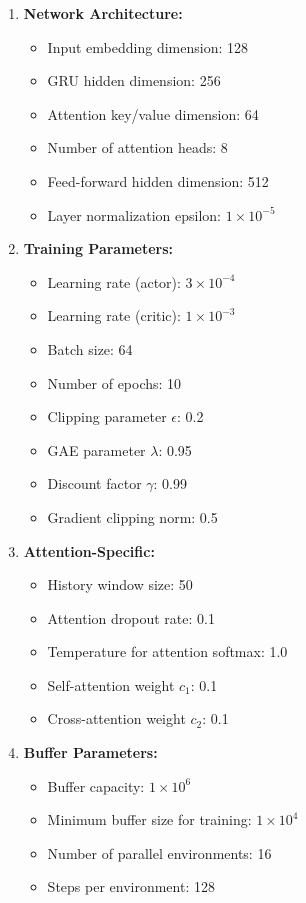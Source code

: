 \begin{enumerate}
\item \textbf{Network Architecture:}
   \begin{itemize}
   \item Input embedding dimension: 128
   \item GRU hidden dimension: 256
   \item Attention key/value dimension: 64
   \item Number of attention heads: 8
   \item Feed-forward hidden dimension: 512
   \item Layer normalization epsilon: $1 \times 10^{-5}$
   \end{itemize}

\item \textbf{Training Parameters:}
   \begin{itemize}
   \item Learning rate (actor): $3 \times 10^{-4}$
   \item Learning rate (critic): $1 \times 10^{-3}$
   \item Batch size: 64
   \item Number of epochs: 10
   \item Clipping parameter $\epsilon$: 0.2
   \item GAE parameter $\lambda$: 0.95
   \item Discount factor $\gamma$: 0.99
   \item Gradient clipping norm: 0.5
   \end{itemize}

\item \textbf{Attention-Specific:}
   \begin{itemize}
   \item History window size: 50
   \item Attention dropout rate: 0.1
   \item Temperature for attention softmax: 1.0
   \item Self-attention weight $c_1$: 0.1
   \item Cross-attention weight $c_2$: 0.1
   \end{itemize}

\item \textbf{Buffer Parameters:}
   \begin{itemize}
   \item Buffer capacity: $1 \times 10^6$
   \item Minimum buffer size for training: $1 \times 10^4$
   \item Number of parallel environments: 16
   \item Steps per environment: 128
   \end{itemize}
\end{enumerate}


